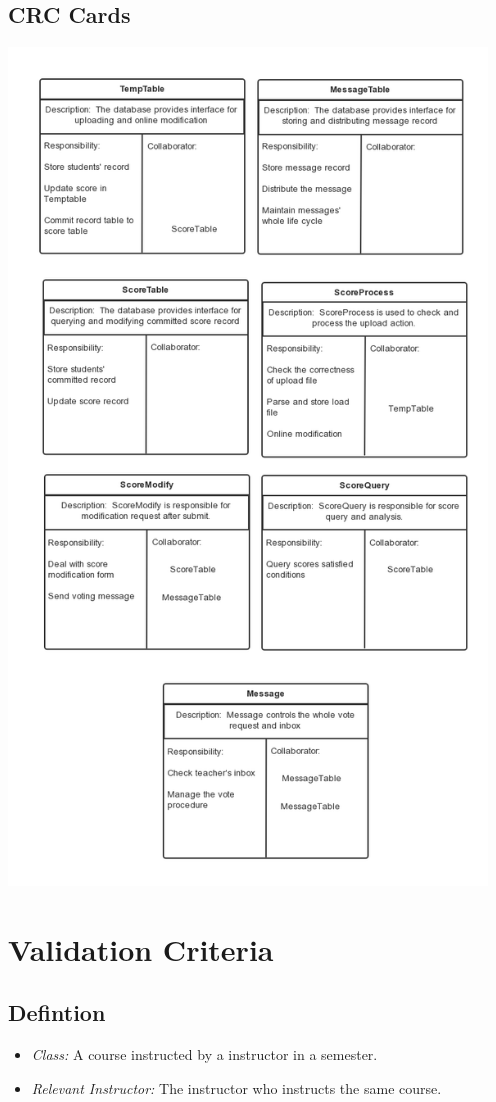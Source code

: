 \documentclass[a4]{article}
\begin{document}
\subsection{CRC Cards}
\includegraphics[width=5in]{pic/5.png}

\section{Validation Criteria}

\subsection{Defintion}
\begin{itemize}
\item \emph{Class:} A course instructed by a instructor in a semester.
\item \emph{Relevant Instructor:} The instructor who instructs the same course.
\end{itemize}
\end{document}
